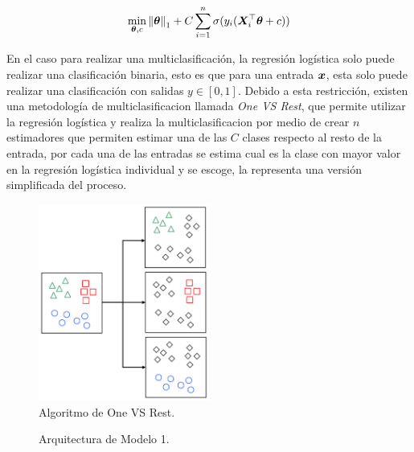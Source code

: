 \begin{equation} \label{eq:ovr-reg-l1costfunc}
  \min_{{\bm{\theta}}, c} \left\lVert{\bm{\theta}}\right\rVert_1 + C \sum_{i=1}^n \sigma(y_i ({\bm{X}}_i^{\top} {\bm{\theta}} + c))
\end{equation}

En el caso para realizar una multiclasificaci\'on, la regresión logística solo puede realizar una clasificación binaria, esto es que para una entrada ${\bm{x}}$, esta solo puede realizar una clasificación con salidas $y \in [0, 1]$. Debido a esta restricción, existen una metodología de multiclasificacion llamada \emph{One VS Rest}, que permite utilizar la regresión logística y realiza la multiclasificacion por medio de crear $n$ estimadores que permiten estimar una de las $C$ clases respecto al resto de la entrada, por cada una de las entradas se estima cual es la clase con mayor valor en la regresión logística individual y se escoge, la  representa una versión simplificada del proceso.

\begin{figure}[H]
  \centering
  \includegraphics[width=0.5\textwidth]{Figures/one-vs-rest.pdf}
\decoRule
\caption[Algoritmo de One VS Rest]{Algoritmo de One VS Rest.}
\label{fig:ovr-algo}
\end{figure}

\begin{figure}[H]
  \centering
\decoRule
\caption[Arquitectura de Modelo 1]{Arquitectura de Modelo 1.}
\label{fig:model1-arch}
\end{figure}

